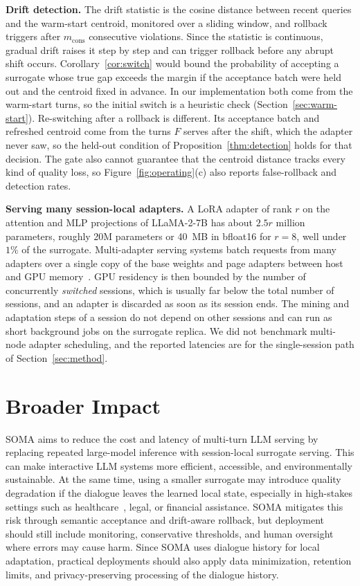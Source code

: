 {\textbf{Drift detection.}
The drift statistic is the cosine distance between recent queries and the warm-start centroid, monitored over a sliding window, and rollback triggers after $m_{\mathrm{cons}}$ consecutive violations. Since the statistic is continuous, gradual drift raises it step by step and can trigger rollback before any abrupt shift occurs. Corollary~\ref{cor:switch} would bound the probability of accepting a surrogate whose true gap exceeds the margin if the acceptance batch were held out and the centroid fixed in advance. In our implementation both come from the warm-start turns, so the initial switch is a heuristic check (Section~\ref{sec:warm-start}). Re-switching after a rollback is different. Its acceptance batch and refreshed centroid come from the turns $F$ serves after the shift, which the adapter never saw, so the held-out condition of Proposition~\ref{thm:detection} holds for that decision. The gate also cannot guarantee that the centroid distance tracks every kind of quality loss, so Figure~\ref{fig:operating}(c) also reports false-rollback and detection rates.

\textbf{Serving many session-local adapters.}
A LoRA adapter of rank $r$ on the attention and MLP projections of LLaMA-2-7B has about $2.5r$ million parameters, roughly 20M parameters or 40~MB in bfloat16 for $r=8$, well under $1\%$ of the surrogate. Multi-adapter serving systems batch requests from many adapters over a single copy of the base weights and page adapters between host and GPU memory~\citep{sheng2023slora}. GPU residency is then bounded by the number of concurrently \emph{switched} sessions, which is usually far below the total number of sessions, and an adapter is discarded as soon as its session ends. The mining and adaptation steps of a session do not depend on other sessions and can run as short background jobs on the surrogate replica. We did not benchmark multi-node adapter scheduling, and the reported latencies are for the single-session path of Section~\ref{sec:method}.}

\section{Broader Impact}
\label{sec:broader_impact}

SOMA aims to reduce the cost and latency of multi-turn LLM serving by replacing repeated large-model inference with session-local surrogate serving. This can make interactive LLM systems more efficient, accessible, and environmentally sustainable. At the same time, using a smaller surrogate may introduce quality degradation if the dialogue leaves the learned local state, especially in high-stakes settings such as healthcare~\citep{li2026llmclinicalgraphstructure, yu2026health}, legal, or financial assistance. SOMA mitigates this risk through semantic acceptance and drift-aware rollback, but deployment should still include monitoring, conservative thresholds, and human oversight where errors may cause harm. Since SOMA uses dialogue history for local adaptation, practical deployments should also apply data minimization, retention limits, and privacy-preserving processing of the dialogue history.




